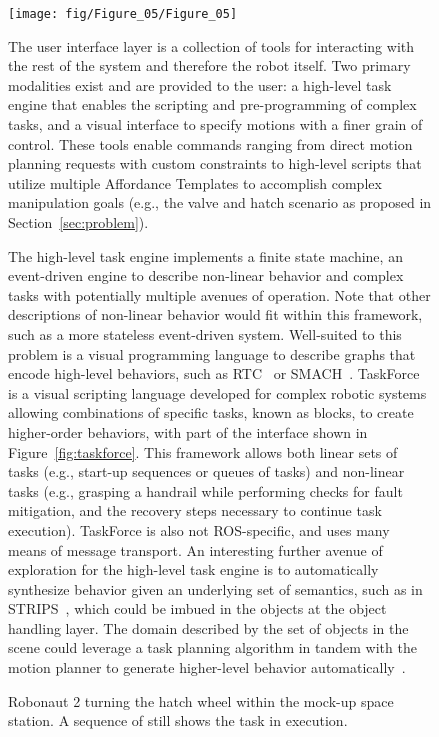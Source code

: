 \begin{figure*}[ht]
  \centering
  \texttt{[image: fig/Figure\_05/Figure\_05]}

  \caption[Robonaut 2 Executing Tasks]{
    \label{fig:case}
    Robonaut 2 turning the hatch wheel within the mock-up space station.
    A sequence of still shows the task in execution.
  }

The user interface layer is a collection of tools for interacting with the rest of the system and therefore the robot itself.
Two primary modalities exist and are provided to the user: a high-level task engine that enables the scripting and pre-programming of complex tasks, and a visual interface to specify motions with a finer grain of control.
These tools enable commands ranging from direct motion planning requests with custom constraints to high-level scripts that utilize multiple Affordance Templates to accomplish complex manipulation goals (e.g., the valve and hatch scenario as proposed in Section~\ref{sec:problem}).

The high-level task engine implements a finite state machine, an event-driven engine to describe non-linear behavior and complex tasks with potentially multiple avenues of operation.
Note that other descriptions of non-linear behavior would fit within this framework, such as a more stateless event-driven system.
Well-suited to this problem is a visual programming language to describe graphs that encode high-level behaviors, such as RTC~\cite{Hart2014} or SMACH~\cite{jonathan2013smach}.
TaskForce is a visual scripting language developed for complex robotic systems allowing combinations of specific tasks, known as blocks, to create higher-order behaviors, with part of the interface shown in Figure~\ref{fig:taskforce}.
This framework allows both linear sets of tasks (e.g., start-up sequences or queues of tasks) and non-linear tasks (e.g., grasping a handrail while performing checks for fault mitigation, and the recovery steps necessary to continue task execution).
TaskForce is also not \textsc{ROS}-specific, and uses many means of message transport.
An interesting further avenue of exploration for the high-level task engine is to automatically synthesize behavior given an underlying set of semantics, such as in STRIPS~\cite{fikes1971strips}, which could be imbued in the objects at the object handling layer.
The domain described by the set of objects in the scene could leverage a task planning algorithm in tandem with the motion planner to generate higher-level behavior automatically~\cite{Dantam2016}.


\end{figure*}
